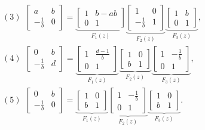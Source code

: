 \documentclass[pdftex]{sigma}
\numberwithin{equation}{section}
\begin{document}
\begin{gather}
{(3)}\ \ \left[
\begin{matrix}
a & b\\
-\frac 1 b &0
\end{matrix}
\right] =
\underbrace{\left[
\begin{matrix}
1 & b-ab\\
0 & 1
\end{matrix}
\right]}_{F_1(z)}
\underbrace{
\left[
\begin{matrix}
1 &0 \\
 -\frac 1 b & 1
\end{matrix}
\right]}_{F_2(z)}
\underbrace{
\left[
\begin{matrix}
1 & b\\
0 & 1
\end{matrix}
\right]}_{F_3(z)},\nonumber\\
 {(4)}\ \ \left[
\begin{matrix}
0 & b\\
-\frac 1 b &d
\end{matrix}
\right] =
\underbrace{\left[
\begin{matrix}
1 &\frac {d-1}b\\
0 & 1
\end{matrix}
\right]}_{F_1(z)}
\underbrace{
\left[
\begin{matrix}
1 &0 \\
 b & 1
\end{matrix}
\right]}_{F_2(z)}
\underbrace{
\left[
\begin{matrix}
1 & -\frac 1 b \\
0 & 1
\end{matrix}
\right]}_{F_3(z)},\nonumber \\
{(5)}\ \ \left[
\begin{matrix}
0 & b\\
-\frac 1 b &0
\end{matrix}
\right] =
\underbrace{\left[
\begin{matrix}
1 & 0\\
b & 1
\end{matrix}
\right]}_{F_1(z)}
\underbrace{
\left[
\begin{matrix}
1 & -\frac 1 b \\
0 & 1
\end{matrix}
\right]}_{F_2(z)}
\underbrace{
\left[
\begin{matrix}
1 & 0\\
b & 1
\end{matrix}
\right]}_{F_3(z)}.\label{Factorizations}
\end{gather}
\end{document}
